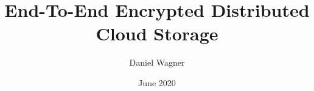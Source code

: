 \documentclass[a4paper,twocolumn]{article}
\begin{document}
\title{End-To-End Encrypted Distributed Cloud Storage}
\author{Daniel Wagner}
\date{June 2020}

\maketitle











\newpage


\end{document}
